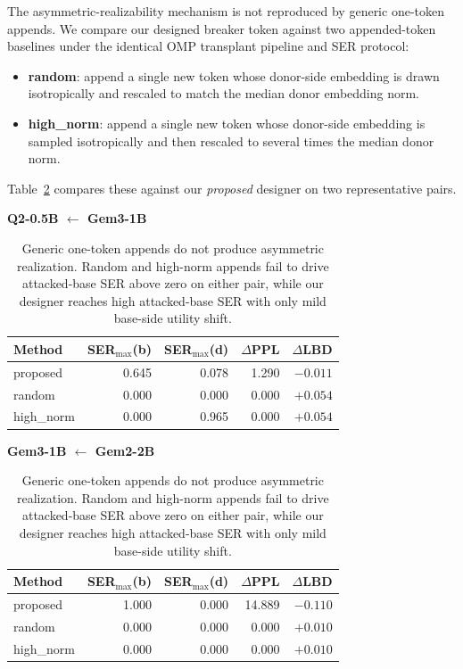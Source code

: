 The asymmetric-realizability mechanism is not reproduced by generic one-token appends. We compare our designed breaker token against two appended-token baselines under the identical OMP transplant pipeline and SER protocol:
\begin{itemize}[leftmargin=*,nosep]
    \item \textbf{random}: append a single new token whose donor-side embedding is drawn isotropically and rescaled to match the median donor embedding norm.
    \item \textbf{high\_norm}: append a single new token whose donor-side embedding is sampled isotropically and then rescaled to several times the median donor norm.
\end{itemize}
Table~\ref{tab:baselines} compares these against our \emph{proposed} designer on two representative pairs.

\begin{table}[!htbp]
\centering
\small
\setlength{\tabcolsep}{3pt}
\caption{Generic one-token appends do not produce asymmetric realization. Random and high-norm appends fail to drive attacked-base SER above zero on either pair, while our designer reaches high attacked-base SER with only mild base-side utility shift.}
\label{tab:baselines}
\begin{minipage}[t]{0.49\linewidth}
  \centering
  \textbf{Q2-0.5B $\leftarrow$ Gem3-1B}\\[2pt]
  \begin{tabular}{lrrrr}
  \toprule
  Method & SER$_{\max}$(b) & SER$_{\max}$(d) & $\Delta$PPL & $\Delta$LBD \\
  \midrule
  proposed   & 0.645 & 0.078 & 1.290 & $-0.011$ \\
  random     & 0.000 & 0.000 & 0.000 & $+0.054$ \\
  high\_norm & 0.000 & 0.965 & 0.000 & $+0.054$ \\
  \bottomrule
  \end{tabular}
\end{minipage}\hfill
\begin{minipage}[t]{0.49\linewidth}
  \centering
  \textbf{Gem3-1B $\leftarrow$ Gem2-2B}\\[2pt]
  \begin{tabular}{lrrrr}
  \toprule
  Method & SER$_{\max}$(b) & SER$_{\max}$(d) & $\Delta$PPL & $\Delta$LBD \\
  \midrule
  proposed   & 1.000 & 0.000 & 14.889 & $-0.110$ \\
  random     & 0.000 & 0.000 & 0.000  & $+0.010$ \\
  high\_norm & 0.000 & 0.000 & 0.000  & $+0.010$ \\
  \bottomrule
  \end{tabular}
\end{minipage}
\end{table}

